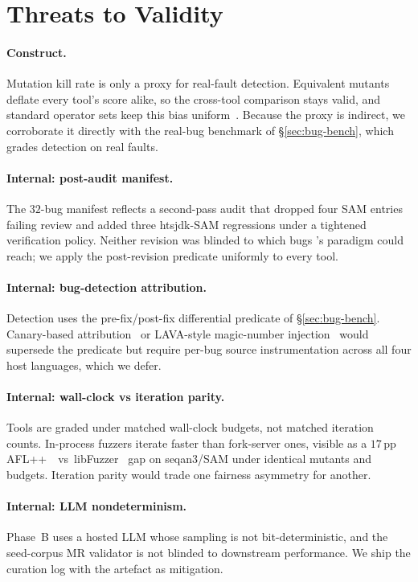 \section{Threats to Validity}
\label{sec:threats}

\paragraph{Construct.}
Mutation kill rate is only a proxy for real-fault detection.
Equivalent mutants deflate every tool's score alike, so the
cross-tool comparison stays valid, and standard operator sets
keep this bias uniform~\citep{papadakis2019mutation}. Because the
proxy is indirect, we corroborate it directly with the real-bug
benchmark of \S\ref{sec:bug-bench}, which grades detection on
real faults.

\paragraph{Internal: post-audit manifest.}
The $32$-bug manifest reflects a second-pass audit that dropped four
SAM entries failing review and added three htsjdk-SAM regressions
under a tightened verification policy. Neither revision was blinded
to which bugs \biotest{}'s paradigm could reach; we apply the
post-revision predicate uniformly to every tool.

\paragraph{Internal: bug-detection attribution.}
Detection uses the pre-fix/post-fix differential predicate of
\S\ref{sec:bug-bench}. Canary-based
attribution~\cite{hazimeh2020magma} or LAVA-style magic-number
injection~\cite{dolangavitt2016lava} would supersede the predicate
but require per-bug source instrumentation across all four host
languages, which we defer.

\paragraph{Internal: wall-clock vs iteration parity.}
Tools are graded under matched wall-clock budgets, not matched
iteration counts. In-process fuzzers iterate faster than fork-server
ones, visible as a $17$\,pp
AFL++~\citep{fioraldi2020aflpp}~vs~libFuzzer~\citep{libfuzzer2024}
gap on seqan3/SAM under identical mutants and budgets. Iteration
parity would trade one fairness asymmetry for another.

\paragraph{Internal: LLM nondeterminism.}
Phase~B uses a hosted LLM whose sampling is not bit-deterministic,
and the seed-corpus MR validator is not blinded to downstream
performance. We ship the curation log with the artefact as
mitigation.

